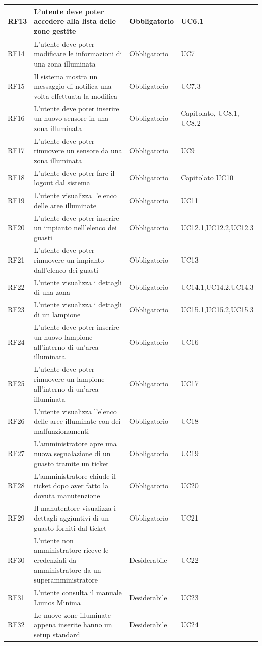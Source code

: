 \documentclass[12pt]{article}
\begin{document}
\begin{xltabular}{\linewidth}{|>{\hsize}X|>{\hsize}X|>{\hsize}X|>{\hsize}X|}
\hline				
RF13	 & L'utente deve poter accedere alla lista delle zone gestite	 & Obbligatorio	 & UC6.1 \\
\hline				
RF14	 & L'utente deve poter modificare le informazioni di una zona illuminata	 & Obbligatorio	 & UC7 \\
\hline				
RF15	 & Il sistema mostra un messaggio di notifica una volta effettuata la modifica	 & Obbligatorio	 & UC7.3 \\
\hline				
RF16	 & L'utente deve poter inserire un nuovo sensore in una zona illuminata	 & Obbligatorio	 & Capitolato, UC8.1, UC8.2 \\
\hline 				
RF17	 & L'utente deve poter rimuovere un sensore da una zona illuminata	 & Obbligatorio	 & UC9 \\
\hline				
RF18	 & L'utente deve poter fare il logout dal sistema	 & Obbligatorio	 & Capitolato UC10 \\
\hline				
RF19	 & L'utente visualizza l'elenco delle aree illuminate	 & Obbligatorio	 & UC11 \\
\hline				
RF20	 & L'utente deve poter inserire un impianto nell'elenco dei guasti	 & Obbligatorio	 & UC12.1,UC12.2,UC12.3 \\
\hline				
RF21	 & L'utente deve poter rimuovere un impianto dall'elenco dei guasti	 & Obbligatorio	 & UC13 \\
\hline				
RF22	 & L'utente visualizza i dettagli di una zona	 & Obbligatorio	 & UC14.1,UC14.2,UC14.3 \\
\hline				
RF23	 & L'utente visualizza i dettagli di un lampione	 & Obbligatorio	 & UC15.1,UC15.2,UC15.3 \\
\hline				
RF24	 & L'utente deve poter inserire un nuovo lampione all'interno di un'area illuminata	 & Obbligatorio	 & UC16 \\
\hline				
RF25	 & L'utente deve poter rimuovere un lampione all'interno di un'area illuminata	 & Obbligatorio	 & UC17 \\
\hline				
RF26	 & L'utente visualizza l'elenco delle aree illuminate con dei malfunzionamenti	 & Obbligatorio	 & UC18 \\
\hline				
RF27	 & L'amministratore apre una nuova segnalazione di un guasto tramite un ticket	 & Obbligatorio	 & UC19 \\
\hline				
RF28	 & L'amministratore chiude il ticket dopo aver fatto la dovuta manutenzione	 & Obbligatorio	 & UC20 \\
\hline				
RF29	 & Il manutentore visualizza i dettagli aggiuntivi di un guasto forniti dal ticket	 & Obbligatorio	 & UC21 \\
\hline				
RF30	 & L'utente non amministratore riceve le credenziali da amministratore da un superamministratore	 & Desiderabile	 & UC22 \\
\hline				
RF31	 & L'utente consulta il manuale Lumos Minima	 & Desiderabile	 & UC23 \\
\hline				
RF32	 & Le nuove zone illuminate appena inserite hanno un setup standard	 & Desiderabile	 & UC24 \\
\hline				
\end{xltabular}
\end{document}
